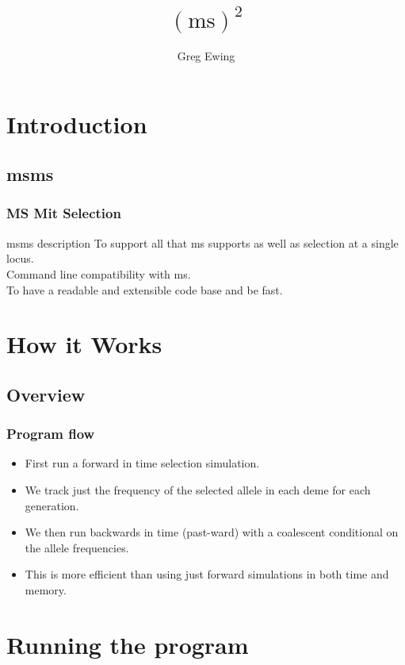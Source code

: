 \documentclass{beamer}
\title{$(\textrm{ms})^2$}
\author{Greg Ewing}
\begin{document}
\begin{frame}
\titlepage
\end{frame}


\section{Introduction}
\subsection{msms}
\begin{frame}
\frametitle{MS Mit Selection}

\begin{block}{msms description}
To support all that ms supports as well as selection at a single locus.\\
Command line compatibility with ms.\\
To have a readable and extensible code base and be fast.
\end{block}
\end{frame}

\section{How it Works}
\subsection{Overview}
\begin{frame}
\frametitle{Program flow}
\begin{itemize}
  \item First run a forward in time selection simulation. 
  \item We track just the frequency of the selected allele in each deme for
  each generation.
  \item We then run backwards in time (past-ward) with a coalescent conditional
  on the allele frequencies.
  \item This is more efficient than using just forward simulations in both time
  and memory. 
\end{itemize}
\end{frame}

\section{Running the program}
\end{document}
